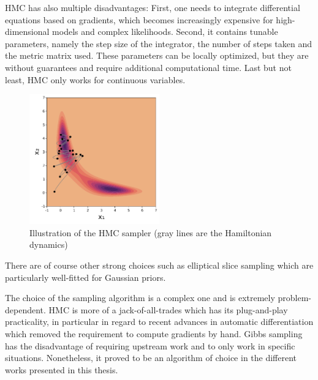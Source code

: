 \ac{HMC} has also multiple disadvantages: 
First, one needs to integrate differential equations based on gradients, which becomes increasingly expensive for high-dimensional models and complex likelihoods. 
Second, it contains tunable parameters, namely the step size of the integrator, the number of steps taken and the metric matrix used.
These parameters can be locally optimized, but they are without guarantees and require additional computational time.
Last but not least, \ac{HMC} only works for continuous variables.

\begin{figure}
    \centering
\includegraphics[width=0.5\textwidth]{./chapters/2_background/figures/hmc_sampling.pdf}
\caption{Illustration of the HMC sampler (gray lines are the Hamiltonian dynamics)}
\label{fig:hmc}
\end{figure}

There are of course other strong choices such as elliptical slice sampling \citet{murray2010elliptical} which are particularly well-fitted for Gaussian priors.

The choice of the sampling algorithm is a complex one and is extremely problem-dependent.
\ac{HMC} is more of a jack-of-all-trades which has its plug-and-play practicality, in particular in regard to recent advances in automatic differentiation which removed the requirement to compute gradients by hand.
Gibbs sampling has the disadvantage of requiring upstream work and to only work in specific situations.
Nonetheless, it proved to be an algorithm of choice in the different works presented in this thesis.



